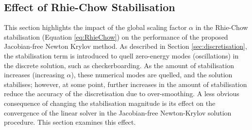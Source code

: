 \documentclass[sn-mathphys,Numbered]{sn-jnl}%
\begin{document}
\subsection{Effect of Rhie-Chow Stabilisation}
This section highlights the impact of the global scaling factor $\alpha$ in the Rhie-Chow stabilisation (Equation \ref{eq:RhieChow}) on the performance of the proposed Jacobian-free Newton Krylov method.
As described in Section \ref{sec:discretisation}, the stabilisation term is introduced to quell zero-energy modes (oscillations) in the discrete solution, such as checkerboarding.
As the amount of stabilisation increases (increasing $\alpha$), these numerical modes are quelled, and the solution stabilises; however, at some point, further increases in the amount of stabilisation reduce the accuracy of the discretisation due to over-smoothing.
A less obvious consequence of changing the stabilisation magnitude is its effect on the convergence of the linear solver in the Jacobian-free Newton-Krylov solution procedure.
This section examines this effect.
\end{document}
